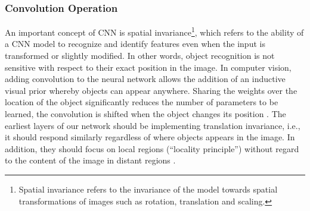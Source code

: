 \documentclass[12pt,a4paper]{scrartcl}
\begin{document}
\subsubsection{Convolution Operation}
An important concept of CNN is spatial invariance\footnote{Spatial invariance refers to the invariance of the model towards spatial transformations of images such as rotation, translation and scaling.}, which refers to the ability of a CNN model to recognize and identify features even when the input is transformed or slightly modified. In other words, object recognition is not sensitive with respect to their exact position in the image. In computer vision, adding convolution to the neural network allows the addition of an inductive visual prior whereby objects can appear anywhere. Sharing the weights over the location of the object significantly reduces the number of parameters to be learned, the convolution is shifted when the object changes its position \cite{CNNSpatialLocation}. The earliest layers of our network should be implementing translation invariance, i.e., it should respond similarly regardless of where objects appears in the image. In addition, they should focus on local regions (``locality principle'') without regard to the content of the image in distant regions \cite{DIDLBook}.
\end{document}
